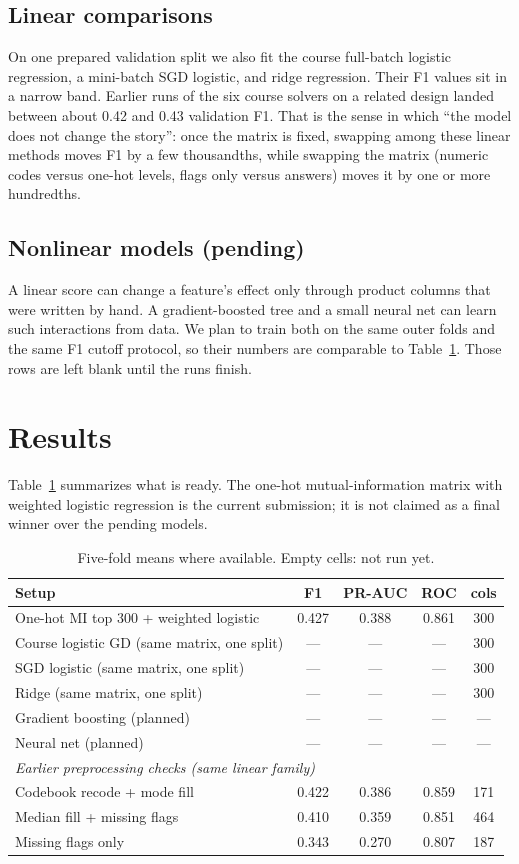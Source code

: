 \documentclass[10pt,conference,compsocconf]{IEEEtran}
\begin{document}
\subsection{Linear comparisons}
On one prepared validation split we also fit the course full-batch logistic
regression, a mini-batch SGD logistic, and ridge regression.
Their F1 values sit in a narrow band.
Earlier runs of the six course solvers on a related design landed between about
0.42 and 0.43 validation F1.
That is the sense in which ``the model does not change the story'': once the
matrix is fixed, swapping among these linear methods moves F1 by a few
thousandths, while swapping the matrix (numeric codes versus one-hot levels,
flags only versus answers) moves it by one or more hundredths.

\subsection{Nonlinear models (pending)}
A linear score can change a feature's effect only through product columns that
were written by hand.
A gradient-boosted tree and a small neural net can learn such interactions from
data.
We plan to train both on the same outer folds and the same F1 cutoff protocol,
so their numbers are comparable to Table~\ref{tab:results}.
Those rows are left blank until the runs finish.

\section{Results}
Table~\ref{tab:results} summarizes what is ready.
The one-hot mutual-information matrix with weighted logistic regression is the
current submission; it is not claimed as a final winner over the pending models.

\begin{table}[t]
\centering
\caption{Five-fold means where available. Empty cells: not run yet.}
\label{tab:results}
\scriptsize
\begin{tabular}{lcccc}
\toprule
Setup & F1 & PR-AUC & ROC & cols \\
\midrule
One-hot MI top 300 + weighted logistic
  & 0.427 & 0.388 & 0.861 & 300 \\
Course logistic GD (same matrix, one split)
  & --- & --- & --- & 300 \\
SGD logistic (same matrix, one split)
  & --- & --- & --- & 300 \\
Ridge (same matrix, one split)
  & --- & --- & --- & 300 \\
Gradient boosting (planned)
  & --- & --- & --- & --- \\
Neural net (planned)
  & --- & --- & --- & --- \\
\midrule
\multicolumn{5}{l}{\emph{Earlier preprocessing checks (same linear family)}} \\
Codebook recode + mode fill
  & 0.422 & 0.386 & 0.859 & 171 \\
Median fill + missing flags
  & 0.410 & 0.359 & 0.851 & 464 \\
Missing flags only
  & 0.343 & 0.270 & 0.807 & 187 \\
\bottomrule
\end{tabular}
\end{table}
\end{document}
